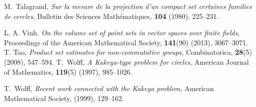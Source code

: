 \documentclass[11pt]{article}
\def\Rbb{\mathbb{R}}
\begin{document}
\begin{thebibliography}{}
 M.~Talagrand, {\em Sur la mesure de la projection d'un compact set certaines families de cercles}, Bulletin des Sciences Math{\'e}matiques, {\bf 104} (1980), 225--231.
 
 L. A. Vinh. {\it On the volume set of point sets in vector spaces over finite fields}, Proceedings of the American Mathematical Society, {\bf 141}(90) (2013), 3067--3071.
T. Tao, \textit{Product set estimates for non-commutative groups}, Combinatorica, \textbf{28}(5) (2008), 547--594.
 T.~Wolff, {\em A {K}akeya-type problem for circles}, American Journal of Mathematics, \textbf{119}(5) (1997), 985--1026.

 T.~Wolff, {\em Recent work connected with the Kakeya problem}, American Mathematical Society, (1999), 129--162.


\end{thebibliography}
\end{document}
